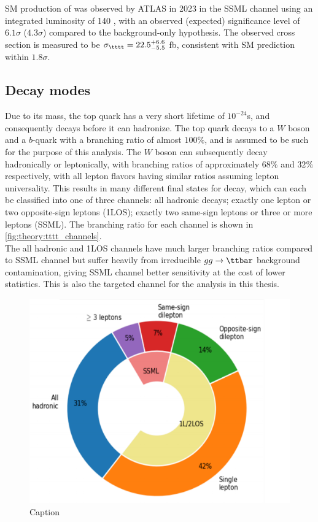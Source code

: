 \documentclass[../thesis.tex]{subfiles}
\begin{document}
\acs{SM} production of \tttt was observed by ATLAS in 2023 in the SSML channel using an integrated luminosity of 140 \fb \citep{tttt_obs}, with an observed (expected) significance level of $6.1\sigma$ ($4.3\sigma$) compared to the background-only hypothesis. The observed cross section is measured to be $\sigma_{\tttt}=22.5^{+6.6}_{-5.5}$ fb, consistent with \acs{SM} prediction within $1.8\sigma$.\\
\subsection*{Decay modes}
Due to its mass, the top quark has a very short lifetime of $10^{-24}$s, and consequently decays before it can hadronize. The top quark decays to a $W$ boson and a $b$-quark with a branching ratio of almost $100\%$, and is assumed to be such for the purpose of this analysis. The $W$ boson can subsequently decay hadronically or leptonically, with branching ratios of approximately $68\%$ and $32\%$ respectively, with all lepton flavors having similar ratios assuming lepton universality. This results in many different final states for \tttt decay, which can each be classified into one of three channels: all hadronic decays; exactly one lepton or two opposite-sign leptons (\acs{1LOS}); exactly two same-sign leptons or three or more leptons (\acs{SSML}). The branching ratio for each channel is shown in \autoref{fig:theory:tttt_channels}.\\
The all hadronic and \acs{1LOS} channels have much larger branching ratios compared to \acs{SSML} channel but suffer heavily from irreducible $gg\rightarrow\ttbar$ background contamination, giving \acs{SSML} channel better sensitivity at the cost of lower statistics. This is also the targeted channel for the analysis in this thesis.

\begin{figure}[!htbp]
\begin{center}
\includegraphics[width=0.7\linewidth]{fig/theory_tttt_channels.png}
\caption{\label{fig:theory:tttt_channels}Caption}
\end{center}
\end{figure}
\end{document}
